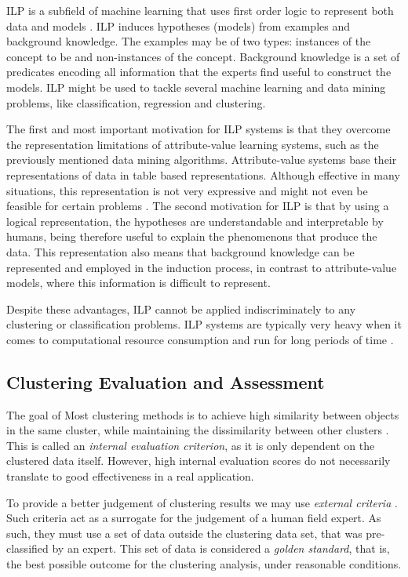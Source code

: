 ILP is a subfield of machine learning that uses first order logic to represent
both data and models \cite{Lavrac1998}. ILP induces hypotheses (models) from
examples and background knowledge. The examples may be of two types: instances
of the concept to be  and non-instances of the concept. Background
knowledge is a set of predicates encoding all information that the experts find
useful to construct the models. ILP might be used to tackle several machine
learning and data mining problems, like classification, regression and
clustering.

The first and most important motivation for ILP systems is that they overcome
the representation limitations of attribute-value learning systems, such as the
previously mentioned data mining algorithms. Attribute-value systems base their
representations of data in table based representations. Although effective in
many situations, this representation is not very expressive and might not even
be feasible for certain problems \cite{Bratko:1995:AIL:219717.219771}. The
second motivation for ILP is that by using a logical representation, the
hypotheses are understandable and interpretable by humans, being therefore
useful to explain the phenomenons that produce the data. This representation
also means that background knowledge can be represented and employed in the
induction process, in contrast to attribute-value models, where this information
is difficult to represent.

Despite these advantages, ILP cannot be applied indiscriminately to any
clustering or classification problems. ILP systems are typically very heavy when
it comes to computational resource consumption and run for long periods of time
\cite{fonseca2003implementation}.

\subsection{Clustering Evaluation and Assessment}\label{sec:clustereval}

The goal of Most clustering methods is to achieve high similarity between
objects in the same cluster, while maintaining the dissimilarity between other
clusters \cite{Manning:2008:IIR:1394399}. This is called an \emph{internal
evaluation criterion}, as it is only dependent on the clustered data itself.
However, high internal evaluation scores do not necessarily translate to good
effectiveness in a real application.

To provide a better judgement of clustering results we may use \emph{external
criteria} \cite{Manning:2008:IIR:1394399}. Such criteria act as a surrogate for
the judgement of a human field expert. As such, they must use a set of data
outside the clustering data set, that was pre-classified by an expert. This set
of data is considered a \emph{golden standard}, that is, the best possible outcome for
the clustering analysis, under reasonable conditions.

